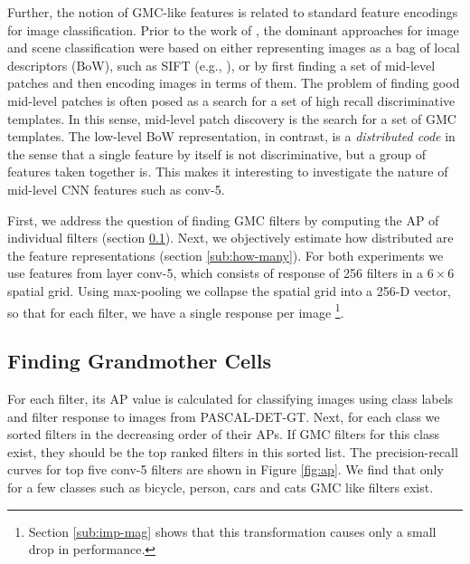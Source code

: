 Further, the notion of GMC-like features is related to standard feature encodings for image classification.
Prior to the work of \cite{Kriz}, the dominant approaches for image and scene classification were based on either representing images as a bag of local descriptors (BoW), such as SIFT (e.g., \cite{lazebnik2006beyond}), or by first finding a set of mid-level patches \cite{Blocks,Mid1} and then encoding images in terms of them. 
The problem of finding good mid-level patches is often posed as a search for a set of high recall discriminative templates. 
In this sense, mid-level patch discovery is the search for a set of GMC templates. 
The low-level BoW representation, in contrast, is a \emph{distributed code} in the sense that a single feature by itself is not discriminative, but a group of features taken together is.
This makes it interesting to investigate the nature of mid-level CNN features such as conv-5. 

First, we address the question of finding GMC filters by computing the AP of individual filters (section \ref{sub:class-specific-unit}). Next, we objectively estimate how distributed are the feature representations (section \ref{sub:how-many}). For both experiments we use features from layer conv-5, which consists of response of 256 filters in a $6\times 6$ spatial grid. Using max-pooling we collapse the spatial grid into a 256-D vector, so that for each filter, we have a single response per image \footnote{Section \ref{sub:imp-mag} shows that this transformation causes only a small drop in performance.}.


\subsection{Finding Grandmother Cells}
\label{sub:class-specific-unit}
For each filter, its AP value is calculated for classifying images using class labels and filter response to images from PASCAL-DET-GT. Next, for each class we sorted filters in the decreasing order of their APs. If GMC filters for this class exist, they should be the top ranked filters in this sorted list. The precision-recall curves for top five conv-5 filters are shown in Figure \ref{fig:ap}. We find that only for a few classes such as bicycle, person, cars and cats GMC like filters exist.

